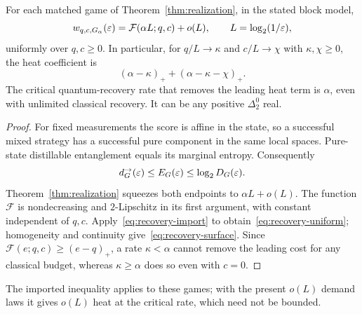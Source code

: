 \begin{corollary}\label{cor:recovery-threshold}
For each matched game of Theorem~\ref{thm:realization}, in the stated block model,
\begin{equation}\label{eq:recovery-uniform}
 w_{q,c,G_\alpha}(\varepsilon)=\mathcal F(\alpha L;q,c)+o(L),
 \qquad L=\log_2(1/\varepsilon),
\end{equation}
uniformly over $q,c\ge0$. In particular, for $q/L\to\kappa$ and $c/L\to\chi$ with $\kappa,\chi\ge0$, the heat coefficient is
\begin{equation}\label{eq:recovery-surface}
 (\alpha-\kappa)_++(\alpha-\kappa-\chi)_+.
\end{equation}
The critical quantum-recovery rate that removes the leading heat term is $\alpha$, even with unlimited classical recovery. It can be any positive $\Delta^0_2$ real.
\end{corollary}
\begin{proof}
For fixed measurements the score is affine in the state, so a successful mixed strategy has a successful pure component in the same local spaces. Pure-state distillable entanglement equals its marginal entropy. Consequently
\[
 d^\to_G(\varepsilon)\le E_G(\varepsilon)\le\log_2D_G(\varepsilon).
\]
Theorem~\ref{thm:realization} squeezes both endpoints to $\alpha L+o(L)$. The function $\mathcal F$ is nondecreasing and $2$-Lipschitz in its first argument, with constant independent of $q,c$. Apply~\eqref{eq:recovery-import} to obtain~\eqref{eq:recovery-uniform}; homogeneity and continuity give~\eqref{eq:recovery-surface}. Since $\mathcal F(e;q,c)\ge(e-q)_+$, a rate $\kappa<\alpha$ cannot remove the leading cost for any classical budget, whereas $\kappa\ge\alpha$ does so even with $c=0$.
\end{proof}
The imported inequality applies to these games; with the present $o(L)$ demand laws it gives $o(L)$ heat at the critical rate, which need not be bounded.

